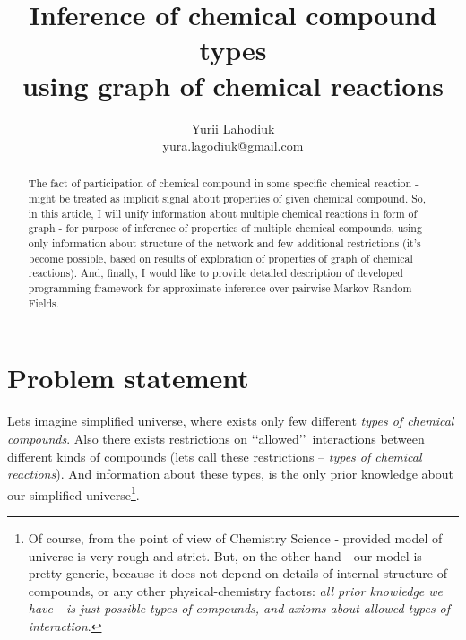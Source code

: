 \documentclass[10pt]{article}
\begin{document}
\title{Inference of chemical compound types \\ using graph of chemical reactions}
\author{Yurii Lahodiuk \\ yura.lagodiuk@gmail.com}
\date{}
\maketitle

\begin{abstract}
The fact of participation of chemical compound in some specific chemical reaction - might be treated as implicit signal about properties of given chemical compound. So, in this article, I will unify information about multiple chemical reactions in form of graph - for purpose of inference of properties of multiple chemical compounds, using only information about structure of the network and few additional restrictions (it's become possible, based on results of exploration of properties of graph of chemical reactions). And, finally, I would like to provide detailed description of developed programming framework\cite{project_on_github} for approximate inference over pairwise Markov Random Fields.
\end{abstract}

\section{Problem statement}
Lets imagine simplified universe, where exists only few different \emph{types of chemical compounds}. 
Also there exists restrictions on \lq \lq allowed\rq \rq\ interactions between different kinds of compounds (lets call these restrictions -- \emph{types of chemical reactions}). And information about these types, is the only prior knowledge about our simplified universe\footnote{Of course, from the point of view of Chemistry Science - provided model of universe is very rough and strict. But, on the other hand - our model is pretty generic, because it does not depend on details of internal structure of compounds, or any other physical-chemistry factors: \emph{all prior knowledge we have - is just possible types of compounds, and axioms about allowed types of interaction}.}.\\
\end{document}
